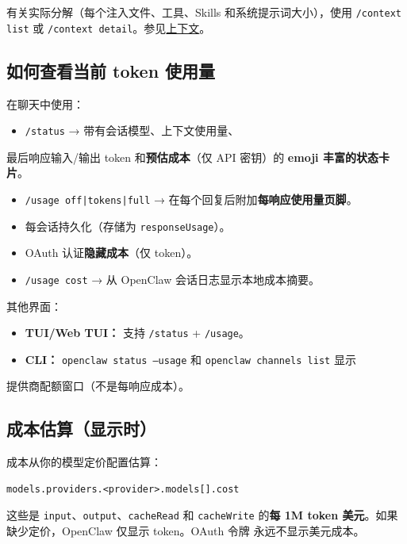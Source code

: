 有关实际分解（每个注入文件、工具、Skills 和系统提示词大小），使用 \texttt{/context list} 或 \texttt{/context detail}。参见\href{/concepts/context}{上下文}。

\subsection{如何查看当前 token 使用量}


在聊天中使用：

\begin{itemize}
  \item \texttt{/status} → 带有会话模型、上下文使用量、
\end{itemize}

最后响应输入/输出 token 和\textbf{预估成本}（仅 API 密钥）的 \textbf{emoji 丰富的状态卡片}。
\begin{itemize}
  \item \texttt{/usage off|tokens|full} → 在每个回复后附加\textbf{每响应使用量页脚}。
  \item 每会话持久化（存储为 \texttt{responseUsage}）。
  \item OAuth 认证\textbf{隐藏成本}（仅 token）。
  \item \texttt{/usage cost} → 从 OpenClaw 会话日志显示本地成本摘要。
\end{itemize}


其他界面：

\begin{itemize}
  \item \textbf{TUI/Web TUI：} 支持 \texttt{/status} + \texttt{/usage}。
  \item \textbf{CLI：} \texttt{openclaw status --usage} 和 \texttt{openclaw channels list} 显示
\end{itemize}

提供商配额窗口（不是每响应成本）。

\subsection{成本估算（显示时）}


成本从你的模型定价配置估算：

\begin{lstlisting}
models.providers.<provider>.models[].cost
\end{lstlisting}


这些是 \texttt{input}、\texttt{output}、\texttt{cacheRead} 和
\texttt{cacheWrite} 的\textbf{每 1M token 美元}。如果缺少定价，OpenClaw 仅显示 token。OAuth 令牌
永远不显示美元成本。

